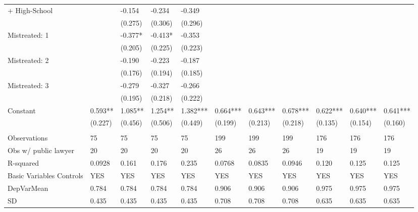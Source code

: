 \begin{tabular}{lllllllllll}
+ High-School &       & -0.154 & -0.234 & -0.349 &       &       &       &       &       &  \\
      &       & (0.275) & (0.306) & (0.296) &       &       &       &       &       &  \\
Mistreated: 1 &       & -0.377* & -0.413* & -0.353 &       &       &       &       &       &  \\
      &       & (0.205) & (0.225) & (0.223) &       &       &       &       &       &  \\
Mistreated: 2 &       & -0.190 & -0.223 & -0.187 &       &       &       &       &       &  \\
      &       & (0.176) & (0.194) & (0.185) &       &       &       &       &       &  \\
Mistreated: 3 &       & -0.279 & -0.327 & -0.266 &       &       &       &       &       &  \\
      &       & (0.195) & (0.218) & (0.222) &       &       &       &       &       &  \\
Constant & 0.593** & 1.085** & 1.254** & 1.382*** & 0.664*** & 0.643*** & 0.678*** & 0.622*** & 0.640*** & 0.641*** \\
      & (0.227) & (0.456) & (0.506) & (0.449) & (0.199) & (0.213) & (0.218) & (0.135) & (0.154) & (0.160) \\
      &       &       &       &       &       &       &       &       &       &  \\
\midrule
Observations & 75    & 75    & 75    & 75    & 199   & 199   & 199   & 176   & 176   & 176 \\
Obs w/ public lawyer & 20    & 20    & 20    & 20    & 26    & 26    & 26    & 19    & 19    & 19 \\
R-squared & 0.0928 & 0.161 & 0.176 & 0.235 & 0.0768 & 0.0835 & 0.0946 & 0.120 & 0.125 & 0.125 \\
Basic Variables Controls & YES   & YES   & YES   & YES   & YES   & YES   & YES   & YES   & YES   & YES \\
DepVarMean & 0.784 & 0.784 & 0.784 & 0.784 & 0.906 & 0.906 & 0.906 & 0.975 & 0.975 & 0.975 \\
SD    & 0.435 & 0.435 & 0.435 & 0.435 & 0.708 & 0.708 & 0.708 & 0.635 & 0.635 & 0.635 \\
\bottomrule
\bottomrule
\end{tabular}%
